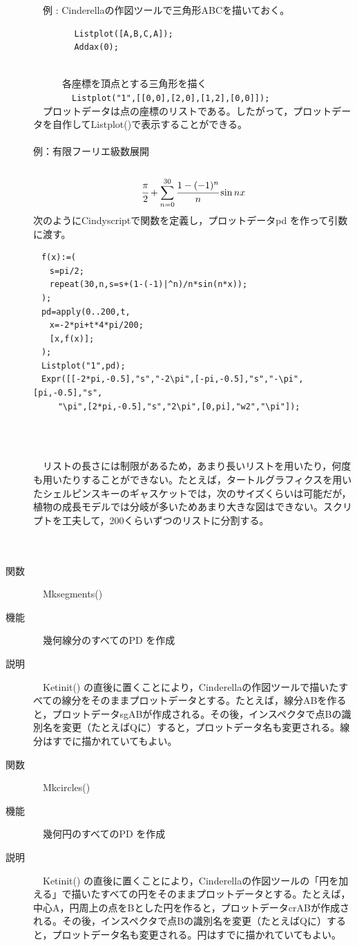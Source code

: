 \documentclass[papersize,a4paper,12pt,uplatex]{jsarticle}
\begin{document}
\begin{description}
　例 : Cinderellaの作図ツールで三角形ABCを描いておく。
\begin{verbatim}
　　　　　Listplot([A,B,C,A]);
　　　　　Addax(0);
\end{verbatim}
　　　　\\
　　　各座標を頂点とする三角形を描く\\
　　　　\verb|Listplot("1",[[0,0],[2,0],[1,2],[0,0]]);|
\\
　プロットデータは点の座標のリストである。したがって，プロットデータを自作してListplot()で表示することができる。\\
　\\
例：有限フーリエ級数展開\\
　　　　　　　　 \[\cfrac{\pi}{2}+\sum_{n=0}^{30} \cfrac{1-(-1)^n}{n}\sin nx\]
次のようにCindyscriptで関数を定義し，プロットデータpd を作って引数に渡す。
\begin{verbatim}
　f(x):=(
　　s=pi/2;
　　repeat(30,n,s=s+(1-(-1)|^n)/n*sin(n*x));
　);
　pd=apply(0..200,t,
　　x=-2*pi+t*4*pi/200;
　　[x,f(x)];
　);
　Listplot("1",pd);
　Expr([[-2*pi,-0.5],"s","-2\pi",[-pi,-0.5],"s","-\pi",[pi,-0.5],"s",
　　　"\pi",[2*pi,-0.5],"s","2\pi",[0,pi],"w2","\pi"]);
\end{verbatim}
　\\
\begin{center}

\end{center}
　\\
　リストの長さには制限があるため，あまり長いリストを用いたり，何度も用いたりすることができない。たとえば，タートルグラフィクスを用いたシェルピンスキーのギャスケットでは，次のサイズくらいは可能だが，植物の成長モデルでは分岐が多いためあまり大きな図はできない。スクリプトを工夫して，200くらいずつのリストに分割する。\\
　　　　　　
　\\
　\\
\hypertarget{mesegmets}{}
\item[関数]　Mksegments()
\item[機能]　幾何線分のすべてのPD を作成
\item[説明]　Ketinit() の直後に置くことにより，Cinderellaの作図ツールで描いたすべての線分をそのままプロットデータとする。たとえば，線分ABを作ると，プロットデータsgABが作成される。その後，インスペクタで点Bの識別名を変更（たとえばQに）すると，プロットデータ名も変更される。線分はすでに描かれていてもよい。\\

\hypertarget{mkcircle}{}
\item[関数]　Mkcircles()
\item[機能]　幾何円のすべてのPD を作成
\item[説明]　Ketinit() の直後に置くことにより，Cinderellaの作図ツールの「円を加える」で描いたすべての円をそのままプロットデータとする。たとえば，中心A，円周上の点をBとした円を作ると，プロットデータcrABが作成される。その後，インスペクタで点Bの識別名を変更（たとえばQに）すると，プロットデータ名も変更される。円はすでに描かれていてもよい。\\
\\


\end{description}
\end{document}
